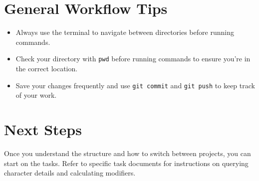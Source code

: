 \documentclass{article}
\begin{document}
	\section*{General Workflow Tips}
	\begin{itemize}
		\item Always use the terminal to navigate between directories before running commands.
		\item Check your directory with \texttt{pwd} before running commands to ensure you’re in the correct location.
		\item Save your changes frequently and use \texttt{git commit} and \texttt{git push} to keep track of your work.
	\end{itemize}
	
	\section*{Next Steps}
	Once you understand the structure and how to switch between projects, you can start on the tasks. Refer to specific task documents for instructions on querying character details and calculating modifiers.
	
\end{document}
